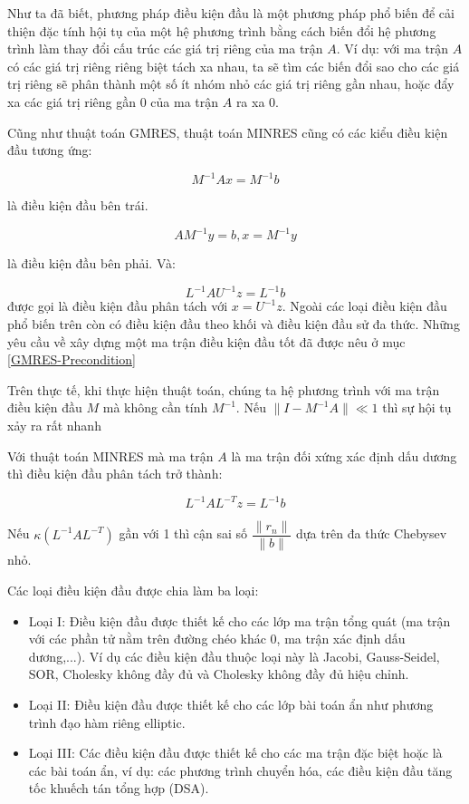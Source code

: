 \documentclass[14pt, a4paper]{article}
\numberwithin{equation}{section}
\numberwithin{algorithm}{section}
\numberwithin{figure}{section}
\numberwithin{dl}{section}
\numberwithin{md}{section}
\numberwithin{bd}{section}
\numberwithin{dn}{section}
\begin{document}
Như ta đã biết, phương pháp điều kiện đầu là một phương pháp phổ biến để cải thiện đặc tính hội tụ của một hệ phương trình bằng cách biến đổi hệ phương trình làm thay đổi cấu trúc các giá trị riêng của ma trận $A$.
Ví dụ: với ma trận $A$ có các giá trị riêng riêng biệt tách xa nhau, ta sẽ tìm các biến đổi sao cho các giá trị riêng sẽ phân thành một số ít nhóm nhỏ các giá trị riêng gần nhau, hoặc đẩy xa các giá trị riêng gần 0 của ma trận $A$ ra xa 0.

Cũng như thuật toán GMRES, thuật toán MINRES cũng có các kiểu điều kiện đầu tương ứng:

\begin{equation}
    M^{-1}Ax = M^{-1}b
\end{equation}

là điều kiện đầu bên trái.

\begin{equation}
    AM^{-1}y = b, x = M^{-1}y
\end{equation}

là điều kiện đầu bên phải. Và:

\begin{equation}
    L^{-1}AU^{-1}z = L^{-1}b
\end{equation}
được gọi là điều kiện đầu phân tách với $x = U^{-1}z$.
Ngoài các loại điều kiện đầu phổ biến trên còn có điều kiện đầu theo khối và điều kiện đầu sử đa thức.
Những yêu cầu về xây dựng một ma trận điều kiện đầu tốt đã được nêu ở mục \ref{GMRES-Precondition}

Trên thực tế, khi thực hiện thuật toán, chúng ta hệ phương trình với ma trận điều kiện đầu $M$ mà không cần tính $M^{-1}$.
Nếu $\lVert I - M^{-1} A \rVert \ll 1$ thì sự hội tụ xảy ra rất nhanh

Với thuật toán MINRES mà ma trận $A$ là ma trận đối xứng xác định dấu dương thì điều kiện đầu phân tách trở thành:

\begin{equation}
    L^{-1}A L^{-T} z = L^{-1}b
\end{equation}

Nếu $\kappa(L^{-1}AL^{-T})$ gần với 1 thì cận sai số $\dfrac{\lVert r_n \rVert}{\lVert b \rVert}$ dựa trên đa thức Chebysev nhỏ.

Các loại điều kiện đầu được chia làm ba loại:

\begin{itemize}
    \item Loại I: Điều kiện đầu được thiết kế cho các lớp ma trận tổng quát (ma trận với các phần tử nằm trên đường chéo khác 0, ma trận xác định dấu dương,...). Ví dụ các điều kiện đầu thuộc loại này là Jacobi, Gauss-Seidel, SOR, Cholesky không đầy đủ và Cholesky không đầy đủ hiệu chỉnh.
    \item Loại II: Điều kiện đầu được thiết kế cho các lớp bài toán ẩn như phương trình đạo hàm riêng elliptic.
    \item Loại III: Các điều kiện đầu được thiết kế cho các ma trận đặc biệt hoặc là các bài toán ẩn, ví dụ: các phương trình chuyển hóa, các điều kiện đầu tăng tốc khuếch tán tổng hợp (DSA).
\end{itemize}
\end{document}
